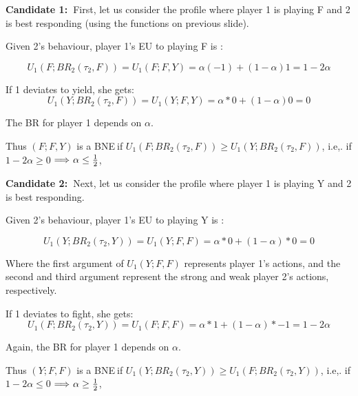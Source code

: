 \documentclass[handout]{beamer}
\begin{document}
\begin{frame}%

\textbf{Candidate 1:\ }First, let us consider the profile where player 1 is
playing F and 2 is best responding (using the functions on previous
slide).\bigskip 

Given 2's behaviour, player 1's EU to playing F is :

\[
U_{1}(F;BR_{2}(\tau _{2},F))=U_{1}(F;F,Y)=\alpha (-1)+(1-\alpha )1=1-2\alpha 
\]

If 1 deviates to yield, she gets:%
\[
U_{1}(Y;BR_{2}(\tau _{2},F))=U_{1}(Y;F,Y)=\alpha \ast 0+(1-\alpha )0=0 
\]

The BR for player 1 depends on $\alpha $. $\ $

\bigskip 

Thus $(F;F,Y)$ is a BNE$\ $if $U_{1}(F;BR_{2}(\tau _{2},F))\geq
U_{1}(Y;BR_{2}(\tau _{2},F))$, i.e,. if $1-2\alpha \geq 0$ $\mathbf{%
\Longrightarrow ~}\alpha \leq \frac{1}{2}$,

\end{frame}%

\begin{frame}%

\textbf{Candidate 2:\ }Next, let us consider the profile where player 1 is
playing Y and 2 is best responding.

Given 2's behaviour, player 1's EU to playing Y is :

\[
U_{1}(Y;BR_{2}(\tau _{2},Y))=U_{1}(Y;F,F)=\alpha \ast 0+(1-\alpha )\ast 0=0
\]

{\footnotesize Where the first argument of }$U_{1}(Y;F,F)$ {\footnotesize %
represents player 1's actions, and the second and third argument represent
the strong and weak player 2's actions, respectively.}\bigskip 

If 1 deviates to fight, she gets:%
\[
U_{1}(F;BR_{2}(\tau _{2},Y))=U_{1}(F;F,F)=\alpha \ast 1+(1-\alpha )\ast
-1=1-2\alpha 
\]

Again, the BR for player 1 depends on $\alpha $.\bigskip 

Thus $(Y;F,F)$ is a BNE$\ $if $U_{1}(Y;BR_{2}(\tau _{2},Y))\geq
U_{1}(F;BR_{2}(\tau _{2},Y))$, i.e,. if $1-2\alpha \leq 0$ $\mathbf{%
\Longrightarrow ~}\alpha \geq \frac{1}{2}$,

\end{frame}%
\end{document}

